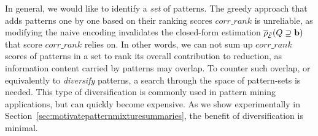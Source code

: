 In general, we would like to identify a \emph{set} of patterns.
The greedy approach that adds patterns one by one based on their ranking scores $corr\_rank$ is unreliable, as modifying the naive encoding invalidates the closed-form estimation $\overline \rho_{\ddot{\mathcal E}}(Q \supseteq \mathbf{b})$ that score $corr\_rank$ relies on.
In other words, we can not sum up $corr\_rank$ scores of patterns in a set to rank its overall contribution to \errorname reduction, as information content carried by patterns may overlap.
To counter such overlap, or equivalently to \textit{diversify} patterns, a search through the space of pattern-sets is needed.
This type of diversification is commonly used in pattern mining applications, but can quickly become expensive.
As we show experimentally in Section~\ref{sec:motivatepatternmixturesummaries}, the benefit of diversification is minimal.

